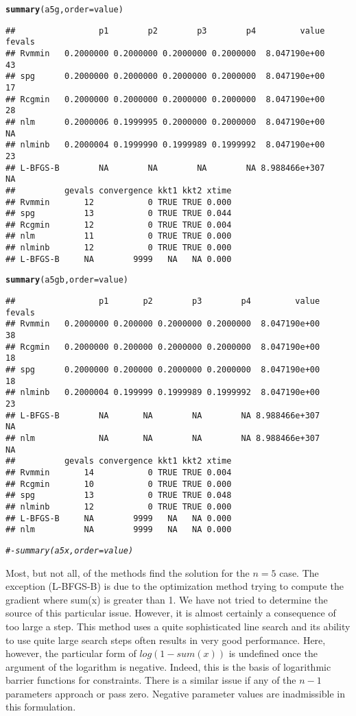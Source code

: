 \documentclass[11pt]{article}\usepackage[]{graphicx}\usepackage[]{color}
\makeatletter
\newcommand{\hlcom}[1]{\textcolor[rgb]{0.678,0.584,0.686}{\textit{#1}}}%
\newcommand{\hlstd}[1]{\textcolor[rgb]{0.345,0.345,0.345}{#1}}%
\newcommand{\hlkwc}[1]{\textcolor[rgb]{0.333,0.667,0.333}{#1}}%
\newcommand{\hlkwd}[1]{\textcolor[rgb]{0.737,0.353,0.396}{\textbf{#1}}}%
\newenvironment{kframe}{%
 \def\at@end@of@kframe{}%
 \ifinner\ifhmode%
  \def\at@end@of@kframe{\end{minipage}}%
  \begin{minipage}{\columnwidth}%
 \fi\fi%
 \def\FrameCommand##1{\hskip\@totalleftmargin \hskip-\fboxsep
 \colorbox{shadecolor}{##1}\hskip-\fboxsep
     \hskip-\linewidth \hskip-\@totalleftmargin \hskip\columnwidth}%
 \MakeFramed {\advance\hsize-\width
   \@totalleftmargin\z@ \linewidth\hsize
   \@setminipage}}%
 {\par\unskip\endMakeFramed%
 \at@end@of@kframe}
\newenvironment{knitrout}{}{} %
\makeatother
\begin{document}
\begin{knitrout}
\begin{kframe}
\begin{alltt}
\hlkwd{summary}\hlstd{(a5g,}\hlkwc{order}\hlstd{=value)}
\end{alltt}
\begin{verbatim}
##                 p1        p2        p3        p4         value fevals
## Rvmmin   0.2000000 0.2000000 0.2000000 0.2000000  8.047190e+00     43
## spg      0.2000000 0.2000000 0.2000000 0.2000000  8.047190e+00     17
## Rcgmin   0.2000000 0.2000000 0.2000000 0.2000000  8.047190e+00     28
## nlm      0.2000006 0.1999995 0.2000000 0.2000000  8.047190e+00     NA
## nlminb   0.2000004 0.1999990 0.1999989 0.1999992  8.047190e+00     23
## L-BFGS-B        NA        NA        NA        NA 8.988466e+307     NA
##          gevals convergence kkt1 kkt2 xtime
## Rvmmin       12           0 TRUE TRUE 0.000
## spg          13           0 TRUE TRUE 0.044
## Rcgmin       12           0 TRUE TRUE 0.004
## nlm          11           0 TRUE TRUE 0.000
## nlminb       12           0 TRUE TRUE 0.000
## L-BFGS-B     NA        9999   NA   NA 0.000
\end{verbatim}
\begin{alltt}
\hlkwd{summary}\hlstd{(a5gb,}\hlkwc{order}\hlstd{=value)}
\end{alltt}
\begin{verbatim}
##                 p1       p2        p3        p4         value fevals
## Rvmmin   0.2000000 0.200000 0.2000000 0.2000000  8.047190e+00     38
## Rcgmin   0.2000000 0.200000 0.2000000 0.2000000  8.047190e+00     18
## spg      0.2000000 0.200000 0.2000000 0.2000000  8.047190e+00     18
## nlminb   0.2000004 0.199999 0.1999989 0.1999992  8.047190e+00     23
## L-BFGS-B        NA       NA        NA        NA 8.988466e+307     NA
## nlm             NA       NA        NA        NA 8.988466e+307     NA
##          gevals convergence kkt1 kkt2 xtime
## Rvmmin       14           0 TRUE TRUE 0.004
## Rcgmin       10           0 TRUE TRUE 0.000
## spg          13           0 TRUE TRUE 0.048
## nlminb       12           0 TRUE TRUE 0.000
## L-BFGS-B     NA        9999   NA   NA 0.000
## nlm          NA        9999   NA   NA 0.000
\end{verbatim}
\begin{alltt}
\hlcom{#- summary(a5x,order=value)}
\end{alltt}
\end{kframe}
\end{knitrout}

Most, but not all, of the methods find the solution for the $n=5$ case. 
The exception (L-BFGS-B) is due to the optimization method trying to 
compute the gradient where sum(x) is greater than 1. We 
have not tried to determine the source of this particular issue. However, 
it is almost certainly 
a consequence of too large a step. This method uses a quite sophisticated
line search and its ability to use quite large search steps often results in
very good performance. Here, however, the particular form of $log(1-sum(x))$ 
is undefined once the argument of
the logarithm is negative. Indeed, this is the basis of 
logarithmic barrier functions for constraints. There
is a similar issue if any of the $n-1$ parameters approach or pass zero. Negative 
parameter values are inadmissible in this formulation. 
\end{document}
